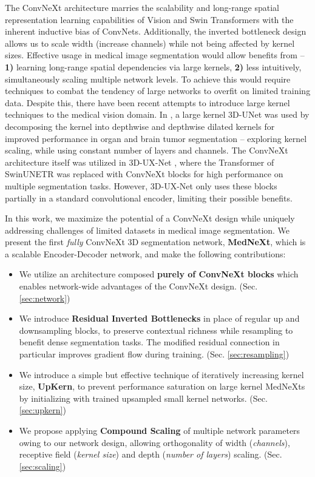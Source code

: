 \documentclass[runningheads]{llncs}
\begin{document}
The ConvNeXt architecture marries the scalability and long-range spatial representation learning capabilities of Vision \cite{dosovitskiy2020image} and Swin Transformers \cite{liu2021swin} with the inherent inductive bias of ConvNets. Additionally, the inverted bottleneck design allows us to scale width (increase channels) while not being affected by kernel sizes. Effective usage in medical image segmentation would allow benefits from -- \textbf{1)} learning long-range spatial dependencies via large kernels, \textbf{2)} less intuitively, simultaneously scaling multiple network levels. To achieve this would require techniques to combat the tendency of large networks to overfit on limited training data. Despite this, there have been recent attempts to introduce large kernel techniques to the medical vision domain. In \cite{li2023large}, a large kernel 3D-UNet \cite{cciccek20163d} was used by decomposing the kernel into depthwise and depthwise dilated kernels for improved performance in organ and brain tumor segmentation -- exploring kernel scaling, while using constant number of layers and channels. The ConvNeXt architecture itself was utilized in 3D-UX-Net \cite{lee20223d}, where the Transformer of SwinUNETR \cite{hatamizadeh2022swin} was replaced with ConvNeXt blocks for high performance on multiple segmentation tasks. However, 3D-UX-Net only uses these blocks partially in a standard convolutional encoder, limiting their possible benefits.

In this work, we maximize the potential of a ConvNeXt design while uniquely addressing challenges of limited datasets in medical image segmentation. We present the first \textit{fully} ConvNeXt 3D segmentation network, \textbf{MedNeXt}, which is a scalable Encoder-Decoder network, and make the following contributions:

\begin{itemize}
    \item We utilize an architecture composed \textbf{purely of ConvNeXt blocks} which enables network-wide advantages of the ConvNeXt design. (Sec. \ref{sec:network})
    \item We introduce \textbf{Residual Inverted Bottlenecks} in place of regular up and downsampling blocks, to preserve contextual richness while resampling to benefit dense segmentation tasks. The modified residual connection in particular improves gradient flow during training.  (Sec.
    \ref{sec:resampling}) 
    \item We introduce a simple but effective technique of iteratively increasing kernel size, \textbf{UpKern}, to prevent performance saturation on large kernel MedNeXts by initializing with trained upsampled small kernel networks. (Sec. \ref{sec:upkern})
    \item We propose applying \textbf{Compound Scaling} \cite{tan2019efficientnet} of multiple network parameters owing to our network design, allowing orthogonality of width (\textit{channels}), receptive field (\textit{kernel size}) and depth (\textit{number of layers}) scaling. (Sec. \ref{sec:scaling})
\end{itemize}
\end{document}

